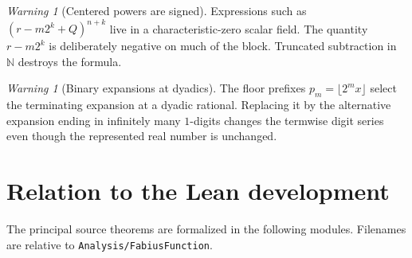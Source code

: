 \documentclass[11pt,oneside]{article}
\theoremstyle{definition}
\theoremstyle{remark}
\newtheorem{warning}[theorem]{Warning}
\newcommand{\N}{\mathbb N}
\newcommand{\repo}{\nolinkurl{Analysis/FabiusFunction}}
\begin{document}
\begin{warning}[Centered powers are signed]
Expressions such as $(r-m2^k+Q)^{n+k}$ live in a characteristic-zero scalar field.  The
quantity $r-m2^k$ is deliberately negative on much of the block.  Truncated subtraction in
$\N$ destroys the formula.
\end{warning}

\begin{warning}[Binary expansions at dyadics]
The floor prefixes $p_m=\lfloor2^mx\rfloor$ select the terminating expansion at a dyadic
rational.  Replacing it by the alternative expansion ending in infinitely many $1$-digits
changes the termwise digit series even though the represented real number is unchanged.
\end{warning}

\section{Relation to the Lean development}
\label{sec:formal-map}

The principal source theorems are formalized in the following modules.  Filenames are relative
to \repo.
\end{document}
